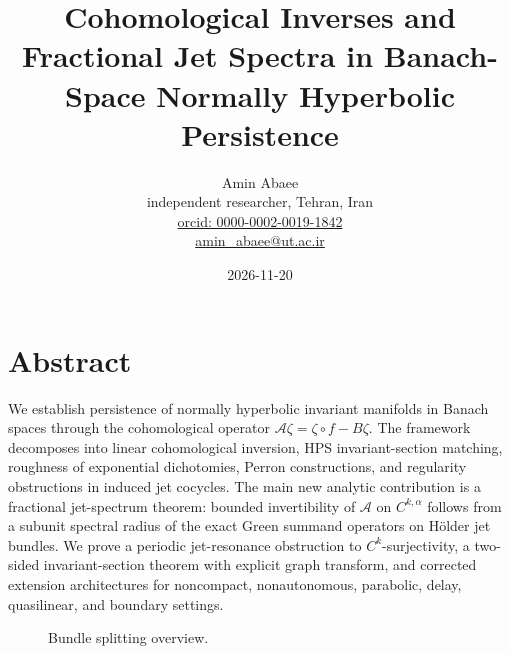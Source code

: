 \documentclass[11pt,a4paper]{article}
\title{Cohomological Inverses and Fractional Jet Spectra in Banach-Space Normally Hyperbolic Persistence}
\author{Amin Abaee \\ independent researcher, Tehran, Iran \\ \href{https://orcid.org/0000-0002-0019-1842}{orcid: 0000-0002-0019-1842} \\ \href{mailto:amin_abaee@ut.ac.ir}{amin\_abaee@ut.ac.ir}}
\date{2026-11-20}
\theoremstyle{plain}
\theoremstyle{definition}
\theoremstyle{remark}
\numberwithin{equation}{section}
\numberwithin{figure}{section}
\begin{document}
\maketitle

\section*{Abstract}

We establish persistence of normally hyperbolic invariant manifolds in Banach spaces through the cohomological operator $\mathcal A\zeta=\zeta\circ f-B\zeta$. The framework decomposes into linear cohomological inversion, HPS invariant-section matching, roughness of exponential dichotomies, Perron constructions, and regularity obstructions in induced jet cocycles. The main new analytic contribution is a fractional jet-spectrum theorem: bounded invertibility of $\mathcal A$ on $C^{k,\alpha}$ follows from a subunit spectral radius of the exact Green summand operators on Hölder jet bundles. We prove a periodic jet-resonance obstruction to $C^k$-surjectivity, a two-sided invariant-section theorem with explicit graph transform, and corrected extension architectures for noncompact, nonautonomous, parabolic, delay, quasilinear, and boundary settings.

\begin{center}
\end{center}

\begin{figure}[h]
\centering
{}
\caption{Bundle splitting overview.}
\label{fig:bundle-overview}
\end{figure}
\end{document}
